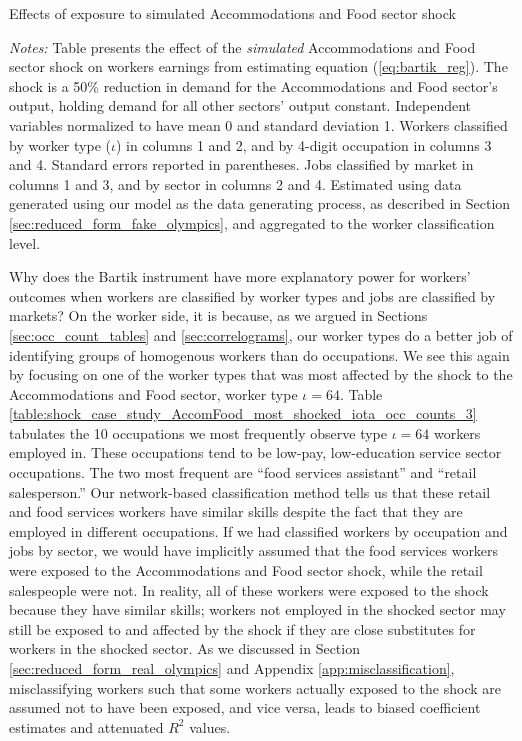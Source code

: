\documentclass[12pt]{article}
\def\i{\iota}
\theoremstyle{definition}
\theoremstyle{plain}
\begin{document}
\begin{table}[h!]
	\centering
	\caption{Effects of exposure to simulated Accommodations and Food sector shock}
	\vspace{-.5cm}
	
	\label{table:fake_data_AccomFood_iota_occ4_exposure_regs_ln_wage_N}
	\footnotesize\flushleft \emph{Notes:} Table presents the effect of the \emph{simulated} Accommodations and Food sector shock on workers earnings from estimating equation (\ref{eq:bartik_reg}). The shock is a 50\% reduction in demand for the Accommodations and Food sector's output, holding demand for all other sectors' output constant. Independent variables normalized to have mean 0 and standard deviation 1. Workers classified by worker type ($\i$) in columns 1 and 2, and by 4-digit occupation in columns 3 and 4. Standard errors reported in parentheses. Jobs classified by market in columns 1 and 3, and by sector in columns 2 and 4. Estimated using data generated using our model as the data generating process, as described in Section \ref{sec:reduced_form_fake_olympics}, and aggregated to the worker classification level.  
\end{table}



Why does the Bartik instrument have more explanatory power for workers' outcomes when workers are classified by worker types and jobs are classified by markets? On the worker side, it is because, as we argued in Sections \ref{sec:occ_count_tables} and \ref{sec:correlograms}, our worker types do a better job of identifying groups of homogenous workers than do occupations. We see this again by focusing on one of the worker types that was most affected by the shock to the Accommodations and Food sector, worker type $\i=64$. Table \ref{table:shock_case_study_AccomFood_most_shocked_iota_occ_counts_3} tabulates the 10 occupations we most frequently observe type $\i=64$ workers employed in. These occupations tend to be low-pay, low-education service sector occupations. The two most frequent are ``food services assistant'' and ``retail salesperson.'' Our network-based classification method tells us that these retail and food services workers have similar skills despite the fact that they are employed in different occupations. If we had classified workers by occupation and jobs by sector, we would have implicitly assumed that the food services workers were exposed to the Accommodations and Food sector shock, while the retail salespeople were not. In reality, all of these workers were exposed to the shock because they have similar skills;  workers not employed in the shocked sector may still be exposed to and affected by the shock if they are close substitutes for workers in the shocked sector.  As we discussed in Section \ref{sec:reduced_form_real_olympics} and Appendix \ref{app:misclassification}, misclassifying workers such that some workers actually exposed to the shock are assumed not to have been exposed, and vice versa, leads to biased coefficient estimates and attenuated $R^2$ values.
\end{document}
